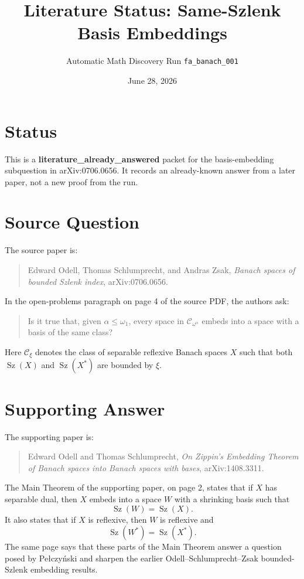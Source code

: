 \documentclass[11pt]{article}
\title{Literature Status: Same-Szlenk Basis Embeddings}
\author{Automatic Math Discovery Run \texttt{fa\_banach\_001}}
\date{June 28, 2026}
\newcommand{\Sz}{\operatorname{Sz}}
\newcommand{\cC}{\mathcal{C}}
\begin{document}
\maketitle

\section*{Status}

This is a \textbf{literature\_already\_answered} packet for the
basis-embedding subquestion in arXiv:0706.0656.  It records an already-known
answer from a later paper, not a new proof from the run.

\section*{Source Question}

The source paper is:
\begin{quote}
Edward Odell, Thomas Schlumprecht, and Andras Zsak,
\emph{Banach spaces of bounded Szlenk index}, arXiv:0706.0656.
\end{quote}

In the open-problems paragraph on page 4 of the source PDF, the authors ask:
\begin{quote}
Is it true that, given \(\alpha\leq \omega_1\), every space in
\(\cC_{\omega^\alpha}\) embeds into a space with a basis of the same class?
\end{quote}
Here \(\cC_\xi\) denotes the class of separable reflexive Banach spaces
\(X\) such that both \(\Sz(X)\) and \(\Sz(X^*)\) are bounded by \(\xi\).

\section*{Supporting Answer}

The supporting paper is:
\begin{quote}
Edward Odell and Thomas Schlumprecht,
\emph{On Zippin's Embedding Theorem of Banach spaces into Banach spaces with
bases}, arXiv:1408.3311.
\end{quote}

The Main Theorem of the supporting paper, on page 2, states that if \(X\) has
separable dual, then \(X\) embeds into a space \(W\) with a shrinking basis
such that
\[
  \Sz(W)=\Sz(X).
\]
It also states that if \(X\) is reflexive, then \(W\) is reflexive and
\[
  \Sz(W^*)=\Sz(X^*).
\]
The same page says that these parts of the Main Theorem answer a question
posed by Pe{\l}czy\'nski and sharpen the earlier Odell--Schlumprecht--Zsak
bounded-Szlenk embedding results.
\end{document}

